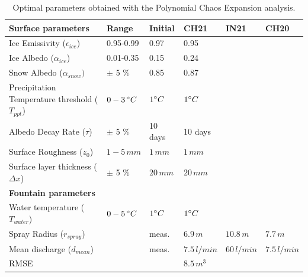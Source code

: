 \documentclass[utf8]{frontiersSCNS} %
\begin{document}
\begin{table}[]
\centering
\caption{Optimal parameters obtained with the Polynomial Chaos Expansion analysis.}
\label{tab:parameter}
\begin{tabular}{@{}llllll@{}}
\toprule
\textbf{Surface parameters} & \textbf{Range} & \textbf{Initial} & \textbf{CH21} & \textbf{IN21} & \textbf{CH20} \\\midrule
     Ice Emissivity ($\epsilon_{ice}$) & 0.95-0.99                    & 0.97        & 0.95  &  &  \\
     Ice Albedo ($\alpha_{ice}$)       & 0.01-0.35                      & 0.15        & 0.24  &  &  \\
     Snow Albedo ($\alpha_{snow})$     &  $\pm$ 5 \%                    & 0.85        & 0.87  &  &  \\
     Precipitation Temperature threshold ($T_{ppt}$) & $0-3\,\degree C$ & $1\degree C$& $1\degree C$ &  &  \\
     Albedo Decay Rate ($\tau$)        & $\pm$ 5 \%                     & 10 days     & 10 days &  &  \\
     Surface Roughness ($z_0$)         & $1-5\, mm$                     & $1\,mm$     & $1\,mm$ &  &  \\ 
     Surface layer thickness ($\Delta x$)&$\pm$ 5 \%                    & $20\,mm$    & $20\,mm$ &  &  \\\midrule 
\textbf{Fountain parameters} & &  & & &  \\\midrule
     Water temperature ($T_{water}$)   & $0-5\,\degree C$               & $1\degree C$&$1\degree C$  &  &  \\ 
     Spray Radius ($r_{spray}$)        &                                & meas.      &$6.9\,m$  &$10.8\,m$  &$7.7\,m$  \\ 
     Mean discharge ($d_{mean}$)       &                                & meas.      &$7.5\,l/min$  &$60\,l/min$  &$7.5\,l/min$  \\\midrule 

     RMSE             &             &         &$8.5\, m^3$  &  &  \\ \bottomrule
\end{tabular}
\end{table}
\end{document}
